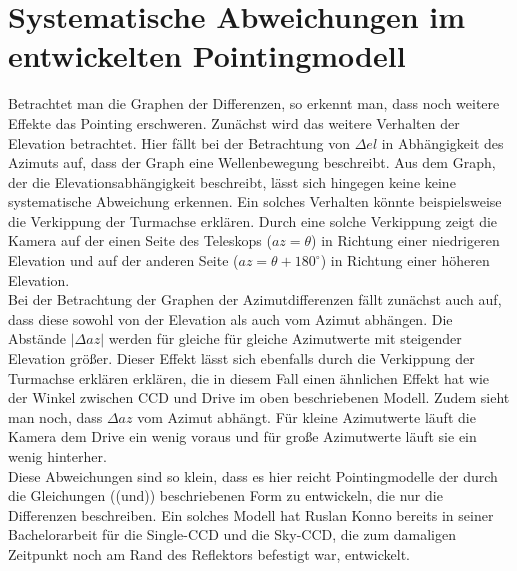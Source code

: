 \section{Systematische Abweichungen im entwickelten Pointingmodell}
Betrachtet man die Graphen der Differenzen, so erkennt man, dass noch weitere Effekte das Pointing erschweren. Zunächst wird das weitere Verhalten der Elevation betrachtet. Hier fällt bei der Betrachtung von $\Delta el$ in Abhängigkeit des Azimuts auf, dass der Graph eine Wellenbewegung beschreibt. Aus dem Graph, der die Elevationsabhängigkeit beschreibt, lässt sich hingegen keine keine systematische Abweichung erkennen. Ein solches Verhalten könnte beispielsweise die Verkippung der Turmachse erklären. Durch eine solche Verkippung zeigt die Kamera auf der einen Seite des Teleskops ($az=\theta$) in Richtung einer niedrigeren Elevation und auf der anderen Seite ($az=\theta+180^{\circ}$) in Richtung einer höheren Elevation.\\
Bei der Betrachtung der Graphen der Azimutdifferenzen fällt zunächst auch auf, dass diese sowohl von der Elevation als auch vom Azimut abhängen. Die Abstände $\left| \Delta az \right|$ werden für gleiche für gleiche Azimutwerte mit steigender Elevation größer. Dieser Effekt lässt sich ebenfalls durch die Verkippung der Turmachse erklären erklären, die in diesem Fall einen ähnlichen Effekt hat wie der Winkel zwischen CCD und Drive im oben beschriebenen Modell. Zudem sieht man noch, dass $\Delta az$ vom Azimut abhängt. Für kleine Azimutwerte läuft die Kamera dem Drive ein wenig voraus und für große Azimutwerte läuft sie ein wenig hinterher.\\
Diese Abweichungen sind so klein, dass es hier reicht Pointingmodelle der durch die Gleichungen ((und)) beschriebenen Form zu entwickeln, die nur die Differenzen beschreiben. Ein solches Modell hat Ruslan Konno bereits in seiner Bachelorarbeit für die Single-CCD und die Sky-CCD, die zum damaligen Zeitpunkt noch am Rand des Reflektors befestigt war, entwickelt. 

